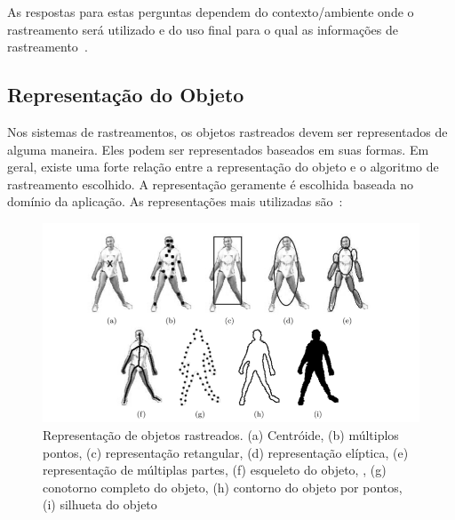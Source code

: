 	As respostas para estas perguntas dependem do contexto/ambiente onde o rastreamento será utilizado e do uso final para o qual as informações de rastreamento~\cite{yilmaz}.

\subsection{Representação do Objeto}

	Nos sistemas de rastreamentos, os objetos rastreados devem ser representados de alguma maneira. Eles podem ser representados baseados em suas formas. Em geral, existe uma forte relação entre a representação do objeto e o algoritmo de rastreamento escolhido. A representação geramente é escolhida baseada no domínio da aplicação. As representações mais utilizadas são~\cite{yilmaz}:

	\begin{figure}[hbt]
		\begin{center}
			\includegraphics[scale=0.5]{figuras/2.FundamentacaoTeorica/representacao.png}
		\end{center}
		\caption{Representação de objetos rastreados. (a) Centróide, (b) múltiplos pontos, (c) representação retangular, (d) representação elíptica, (e) representação de múltiplas partes, (f) esqueleto do objeto, , (g) conotorno completo do objeto, (h) contorno do objeto por pontos, (i) silhueta do objeto~\cite{yilmaz}}
		\label{representacao}
	\end{figure}

